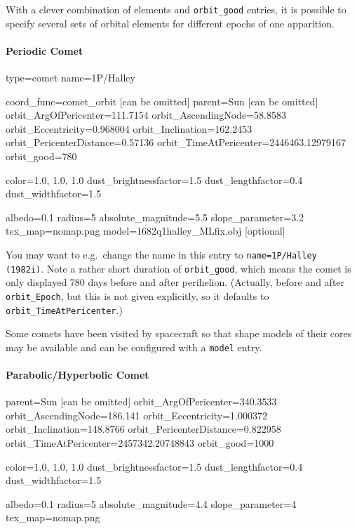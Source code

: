 With a clever combination of elements and \texttt{orbit\_good}
entries,  it is possible to specify several sets of
orbital elements for different epochs of one apparition.

\paragraph{Periodic Comet}
\label{sec:ssystem.ini:Comet:Periodic}

\begin{configfile}
[1phalley]
type=comet  
name=1P/Halley

coord_func=comet_orbit [can be omitted]
parent=Sun [can be omitted]
orbit_ArgOfPericenter=111.7154
orbit_AscendingNode=58.8583
orbit_Eccentricity=0.968004
orbit_Inclination=162.2453
orbit_PericenterDistance=0.57136
orbit_TimeAtPericenter=2446463.12979167
orbit_good=780

color=1.0, 1.0, 1.0
dust_brightnessfactor=1.5
dust_lengthfactor=0.4
dust_widthfactor=1.5

albedo=0.1
radius=5
absolute_magnitude=5.5
slope_parameter=3.2
tex_map=nomap.png
model=1682q1halley_MLfix.obj [optional]
\end{configfile}

You may want to e.g.\ change the name in this entry to
\texttt{name=1P/Halley (1982i)}. Note a rather short duration of
\texttt{orbit\_good}, which means the comet is only displayed 780 days
before and after perihelion. (Actually, before and after
\texttt{orbit\_Epoch}, but this is not given explicitly, so it
defaults to \texttt{orbit\_TimeAtPericenter}.)

Some comets have been visited by spacecraft so that shape models of their cores 
may be available and can be configured with a \texttt{model} entry.

\paragraph{Parabolic/Hyperbolic Comet}
\label{sec:ssystem.ini:Comet:Parabolic}

\begin{configfile}
parent=Sun [can be omitted]
orbit_ArgOfPericenter=340.3533
orbit_AscendingNode=186.141
orbit_Eccentricity=1.000372
orbit_Inclination=148.8766
orbit_PericenterDistance=0.822958
orbit_TimeAtPericenter=2457342.20748843
orbit_good=1000

color=1.0, 1.0, 1.0
dust_brightnessfactor=1.5
dust_lengthfactor=0.4
dust_widthfactor=1.5

albedo=0.1
radius=5
absolute_magnitude=4.4
slope_parameter=4
tex_map=nomap.png
\end{configfile}

